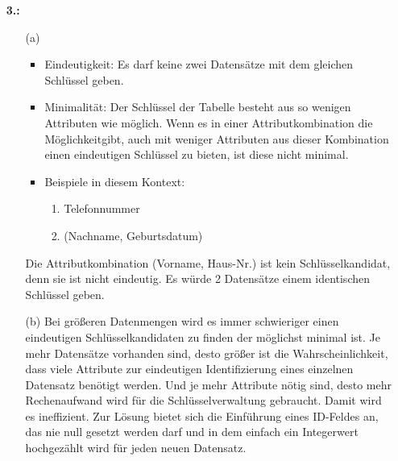 \documentclass[a4paper,11pt,fleqn]{scrartcl}
\begin{document}
\begin{enumerate}
	\item[\textbf{3.:}]
	\begin{enumerate}
		\item[(a)]
			\begin{itemize}
				\item Eindeutigkeit: Es darf keine zwei Datensätze mit dem gleichen Schlüssel geben.
				\item Minimalität: Der Schlüssel der Tabelle besteht aus so wenigen Attributen wie möglich. Wenn es in einer 
				Attributkombination die Möglichkeitgibt, auch mit weniger Attributen aus dieser Kombination einen eindeutigen 
				Schlüssel zu bieten, ist diese nicht minimal.
				\item Beispiele in diesem Kontext:
				\begin{enumerate}
					\item Telefonnummer
					\item (Nachname, Geburtsdatum)
				\end{enumerate}
			\end{itemize}
			Die Attributkombination (Vorname, Haus-Nr.) ist kein Schlüsselkandidat, denn sie ist nicht eindeutig. Es würde 2 
			Datensätze einem identischen Schlüssel geben. \\ 

		\item[(b)]
			Bei größeren Datenmengen wird es immer schwieriger einen eindeutigen Schlüsselkandidaten zu finden der möglichst 
			minimal ist. Je mehr Datensätze vorhanden sind, desto größer ist die Wahrscheinlichkeit, dass viele Attribute zur 
			eindeutigen Identifizierung eines einzelnen Datensatz benötigt werden. Und je mehr Attribute nötig sind, desto mehr 
			Rechenaufwand wird für die Schlüsselverwaltung gebraucht. Damit wird es ineffizient. Zur Lösung bietet sich die 
			Einführung eines ID-Feldes an, das nie null gesetzt werden darf und in dem einfach ein Integerwert hochgezählt wird 
			für jeden neuen Datensatz. 	
		\end{enumerate}	
	\end{enumerate}
\end{document}
